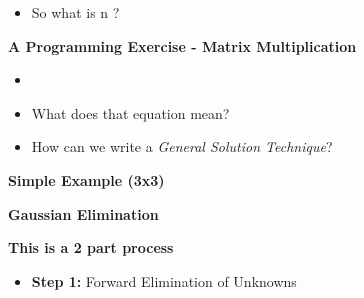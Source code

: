 \documentclass[11pt]{article}
\begin{document}
\begin{description}
\begin{itemize}
\scalebox{1.2}{$
		  \left[ \begin{array}{cc}
		e_{11} & e_{12}  \\
		& \\ 
		e_{21} & e_{22}  \end{array}	\right]=\left[ \begin{array}{c|c}
		f_{11}g_{11}+f_{12}g_{21}+f_{13}g_{31} & f_{11}g_{12}+f_{12}g_{22}+f_{13}g_{32}  \\
		& \\ 
		f_{21}g_{11}+f_{22}g_{21}+f_{23}g_{31} & f_{21}g_{12}+f_{22}g_{22}+f_{23}g_{32}  \end{array}	\right]
		 $} \\\\
		 
	

	\item So what is n ? 
\end{itemize}

\newpage	
	\item \textbf{\LARGE A Programming Exercise - Matrix Multiplication}\\	
		\begin{itemize}
		
		\item  {} \\
		\item What does that equation mean? \\
		\item How can we write a {\it General Solution Technique}?
		\end{itemize}
\newpage




\item \textbf{ Simple Example (3x3)}

\newpage	
	\item \textbf{\LARGE Gaussian Elimination}\\	
	
\newpage
\Large
\item \textbf{ This is a 2 part process}
	
	
	\begin{itemize}
		\item {\bf Step 1:} Forward Elimination of Unknowns
		

\end{itemize}
\end{description}
\end{document}
